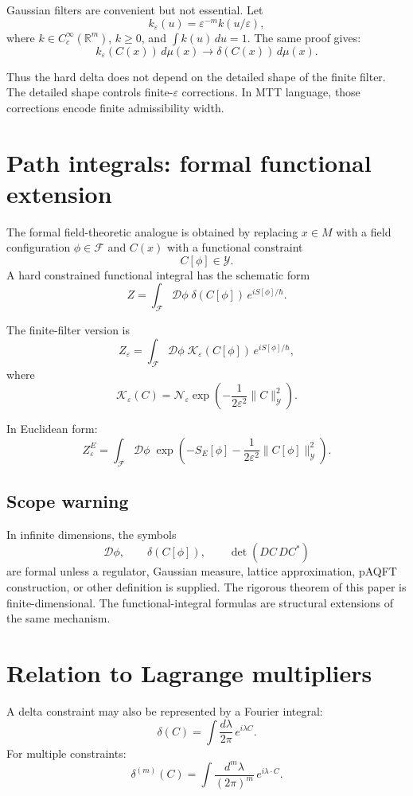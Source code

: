 \documentclass[11pt]{article}
\begin{document}
Gaussian filters are convenient but not essential.  Let
\[
k_\varepsilon(u)=\varepsilon^{-m}k(u/\varepsilon),
\]
where \(k\in C_c^\infty(\mathbb R^m)\), \(k\ge0\), and \(\int k(u)\,du=1\).
The same proof gives:
\[
k_\varepsilon(C(x))\,d\mu(x)\to \delta(C(x))\,d\mu(x).
\]

Thus the hard delta does not depend on the detailed shape of the finite filter.  The detailed
shape controls finite-\(\varepsilon\) corrections.  In MTT language, those corrections encode
finite admissibility width.

\section{Path integrals: formal functional extension}

The formal field-theoretic analogue is obtained by replacing \(x\in M\) with a field
configuration \(\phi\in\mathcal F\) and \(C(x)\) with a functional constraint
\[
C[\phi]\in \mathcal Y .
\]
A hard constrained functional integral has the schematic form
\[
Z=
\int_{\mathcal F}\mathcal D\phi\;
\delta(C[\phi])\,e^{iS[\phi]/\hbar}.
\]

The finite-filter version is
\[
Z_\varepsilon=
\int_{\mathcal F}\mathcal D\phi\;
\mathcal K_\varepsilon(C[\phi])\,e^{iS[\phi]/\hbar},
\]
where
\[
\mathcal K_\varepsilon(C)
=
\mathcal N_\varepsilon
\exp\!\left(-\frac{1}{2\varepsilon^2}\|C\|_{\mathcal Y}^{2}\right).
\]

In Euclidean form:
\[
Z_\varepsilon^E
=
\int_{\mathcal F}\mathcal D\phi\;
\exp\!\left(
-S_E[\phi]
-\frac{1}{2\varepsilon^2}\|C[\phi]\|_{\mathcal Y}^{2}
\right).
\]

\subsection{Scope warning}

In infinite dimensions, the symbols
\[
\mathcal D\phi,\qquad \delta(C[\phi]),\qquad \det(DC\,DC^\ast)
\]
are formal unless a regulator, Gaussian measure, lattice approximation, pAQFT construction,
or other definition is supplied.  The rigorous theorem of this paper is finite-dimensional.
The functional-integral formulas are structural extensions of the same mechanism.

\section{Relation to Lagrange multipliers}

A delta constraint may also be represented by a Fourier integral:
\[
\delta(C)=\int \frac{d\lambda}{2\pi}\,e^{i\lambda C}.
\]
For multiple constraints:
\[
\delta^{(m)}(C)=\int \frac{d^m\lambda}{(2\pi)^m}\,e^{i\lambda\cdot C}.
\]
\end{document}

